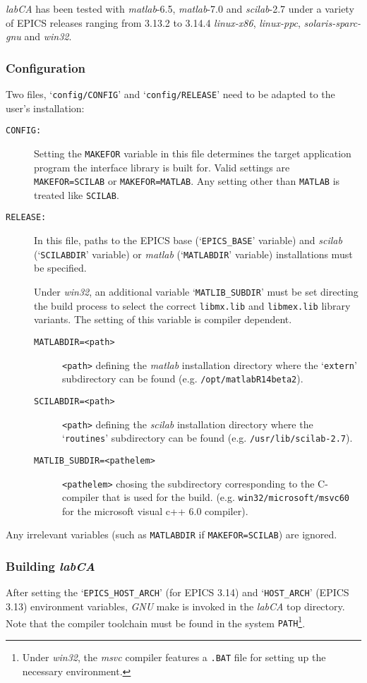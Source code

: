 \documentclass{article}
\newcommand{\sca}{{\em labCA}}
\newcommand{\scilab}{{\em scilab}}
\newcommand{\matlab}{{\em matlab}}
\newcommand{\windoze}{{\em win32}}
\begin{document}
\sca{} has been tested with \matlab-6.5, \matlab-7.0 and \scilab-2.7
under a variety of EPICS releases ranging from 3.13.2
to 3.14.4 {\em linux-x86}, {\em linux-ppc}, {\em solaris-sparc-gnu}
and \windoze.

\subsubsection{Configuration}
Two files, `{\tt config/CONFIG}' and `{\tt config/RELEASE}' need to
be adapted to the user's installation:
\begin{description}
\item[\tt CONFIG:] Setting the {\tt MAKEFOR} variable in this file
determines the target application program the interface library is
built for. Valid settings are {\tt MAKEFOR=SCILAB} or {\tt MAKEFOR=MATLAB}.
Any setting other than {\tt MATLAB} is treated like {\tt SCILAB}.
%
%
\item[\tt RELEASE:] In this file, paths to the EPICS base (`{\tt EPICS\_BASE}'
variable) and \scilab{} (`{\tt SCILABDIR}' variable) or \matlab{} (`{\tt MATLABDIR}'
variable) installations must be specified.

Under \windoze{}, an additional variable
`{\tt MATLIB\_SUBDIR}' must be set directing the build process to select the correct
{\tt libmx.lib} and {\tt libmex.lib} library variants. The setting of this variable
is compiler dependent.
\begin{description}
\item[\tt MATLABDIR=<path>] {\tt <path>} defining the \matlab{} installation
directory where the `{\tt extern}' subdirectory can be found (e.g.
{\tt /opt/matlabR14beta2}).
\item[\tt SCILABDIR=<path>] {\tt <path>} defining the \scilab{} installation
directory where the `{\tt routines}' subdirectory can be found (e.g.
{\tt /usr/lib/scilab-2.7}).
\item[\tt MATLIB\_SUBDIR=<pathelem>] {\tt <pathelem>} chosing the subdirectory
corresponding to the C-compiler that is used for the build. (e.g. 
{\tt win32/microsoft/msvc60} for the microsoft visual c++ 6.0 compiler).
\end{description}
\end{description}
Any irrelevant variables (such as {\tt MATLABDIR} if {\tt MAKEFOR=SCILAB})
are ignored.

\subsubsection{Building \sca}
After setting the
`{\tt EPICS\_HOST\_ARCH}' (for EPICS 3.14) and `{\tt HOST\_ARCH}' (EPICS 3.13)
environment variables, {\em GNU} make is invoked in the \sca{} top 
directory. Note that the compiler toolchain must be found in the system
{\tt PATH}\footnote{
Under \windoze, the {\em msvc} compiler features a {\tt .BAT} file for
setting up the necessary environment.
}.
\end{document}
